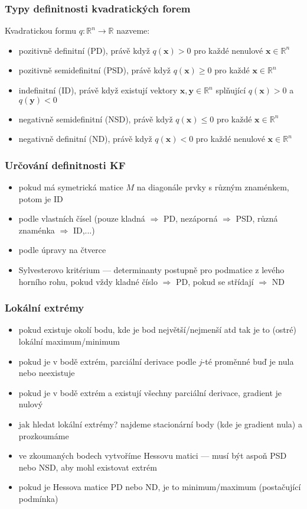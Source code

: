 \subsubsection*{Typy definitnosti kvadratických forem}
Kvadratickou formu $q: \mathbb{R}^n \rightarrow \mathbb{R}$ nazveme:
\begin{itemize}
	\item pozitivně definitní (PD), právě když $q(\textbf{x}) > 0$ pro každé nenulové $\textbf{x} \in \mathbb{R}^n$
	\item pozitivně semidefinitní (PSD), právě když $q(\textbf{x}) \geq 0$ pro každé $\textbf{x} \in \mathbb{R}^n$
	\item indefinitní (ID), právě když existují vektory $\textbf{x}, \textbf{y} \in \mathbb{R}^n$ splňující  $q(\textbf{x}) > 0$ a $q(\textbf{y}) < 0$
	\item negativně semidefinitní (NSD), právě když $q(\textbf{x}) \leq 0$ pro každé $\textbf{x} \in \mathbb{R}^n$
	\item negativně definitní (ND), právě když $q(\textbf{x}) < 0$ pro každé nenulové $\textbf{x} \in \mathbb{R}^n$
\end{itemize}

\subsubsection*{Určování definitnosti KF}
\begin{itemize}
	\item pokud má symetrická matice $M$ na diagonále prvky s různým znaménkem, potom je ID
	\item podle vlastních čísel (pouze kladná $\Rightarrow$ PD, nezáporná $\Rightarrow$ PSD, různá znaménka $\Rightarrow$ ID,...)
	\item podle úpravy na čtverce
	\item Sylvesterovo kritérium --- determinanty postupně pro podmatice z levého horního rohu, pokud vždy kladné číslo $\Rightarrow$ PD, pokud se střídají $\Rightarrow$ ND
\end{itemize}

\subsubsection*{Lokální extrémy}
\begin{itemize}
	\item pokud existuje okolí bodu, kde je bod největší/nejmenší atd tak je to (ostré) lokální maximum/minimum
	\item pokud je v bodě extrém, parciální derivace podle $j$-té proměnné buď je nula nebo neexistuje
	\item pokud je v bodě extrém a existují všechny parciální derivace, gradient je nulový
	\item jak hledat lokální extrémy? najdeme stacionární body (kde je gradient nula) a prozkoumáme
	\item ve zkoumaných bodech vytvoříme Hessovu matici --- musí být aspoň PSD nebo NSD, aby mohl existovat extrém 
	\item pokud je Hessova matice PD nebo ND, je to minimum/maximum (postačující podmínka)
\end{itemize}
